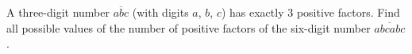 A three-digit number $\overline{abc}$ (with digits $a$, $b$, $c$) has exactly $3$ positive factors. Find all possible values of the number of positive factors of the six-digit number $\overline{abcabc}$.
